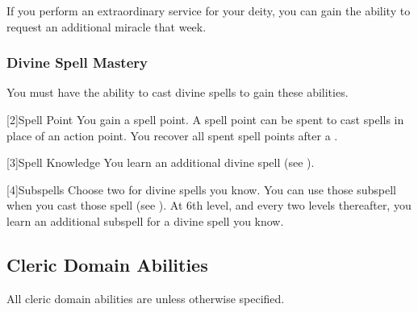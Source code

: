             If you perform an extraordinary service for your deity, you can gain the ability to request an additional miracle that week.

        \subsubsection{Divine Spell Mastery}
            You must have the ability to cast divine spells to gain these abilities.

            [2]{Spell Point}
            You gain a spell point.
            A spell point can be spent to cast spells in place of an action point.
            You recover all spent spell points after a .

            [3]{Spell Knowledge}
            You learn an additional divine spell (see ).

            [4]{Subspells}
            Choose two  for divine spells you know.
            You can use those subspell when you cast those spell (see ).
            At 6th level, and every two levels thereafter, you learn an additional subspell for a divine spell you know.

    \subsection{Cleric Domain Abilities}
        All cleric domain abilities are  unless otherwise specified.

